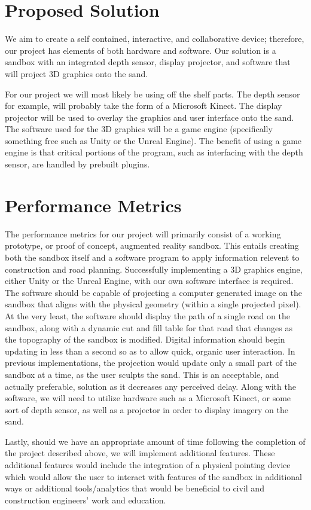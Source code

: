 \documentclass[onecolumn, draftclsnofoot,10pt, compsoc]{IEEEtran}
\begin{document}
\section{Proposed Solution}
We aim to create a self contained, interactive, and collaborative device; therefore, our project has elements of both hardware and software.
Our solution is a sandbox with an integrated depth sensor, display projector, and software that will project 3D graphics onto the sand.
\par
For our project we will most likely be using off the shelf parts.
The depth sensor for example, will probably take the form of a Microsoft Kinect.
The display projector will be used to overlay the graphics and user interface onto the sand.
The software used for the 3D graphics will be a game engine (specifically something free such as Unity or the Unreal Engine).
The benefit of using a game engine is that critical portions of the program, such as interfacing with the depth sensor, are handled by prebuilt plugins.

\section{Performance Metrics}
The performance metrics for our project will primarily consist of a working prototype, or proof of concept, augmented reality sandbox.
This entails creating both the sandbox itself and a software program to apply information relevent to construction and road planning. 
Successfully implementing a 3D graphics engine, either Unity or the Unreal Engine, with our own software interface is required.
The software should be capable of projecting a computer generated image on the sandbox that aligns with the physical geometry (within a single projected pixel).
At the very least, the software should display the path of a single road on the sandbox, along with a dynamic cut and fill table for that road that changes as the topography of the sandbox is modified.
Digital information should begin updating in less than a second so as to allow quick, organic user interaction.
In previous implementations, the projection would update only a small part of the sandbox at a time, as the user sculpts the sand. 
This is an acceptable, and actually preferable, solution as it decreases any perceived delay.
Along with the software, we will need to utilize hardware such as a Microsoft Kinect, or some sort of depth sensor, as well as a projector in order to display imagery on the sand.
\par
Lastly, should we have an appropriate amount of time following the completion of the project described above, we will implement additional features.
These additional features would include the integration of a physical pointing device which would allow the user to interact with features of the sandbox in additional ways or additional tools/analytics that would be beneficial to civil and construction engineers' work and education.
\end{document}
